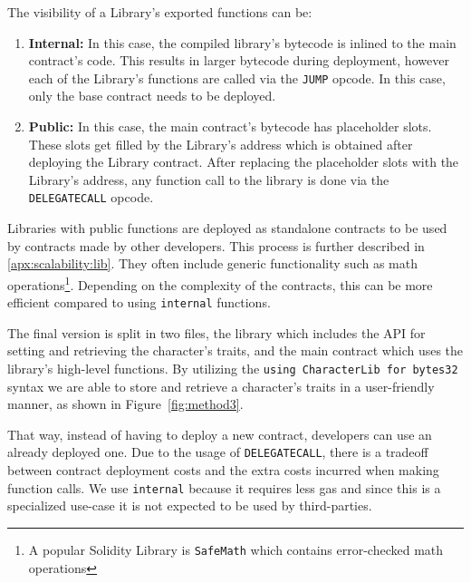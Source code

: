 The visibility of a Library's exported functions can be: 
\begin{enumerate}
    \item \textbf{Internal:}
        In this case, the compiled library's bytecode is inlined to the main contract's code. This results in larger bytecode during deployment, however each of the Library's functions are called via the \texttt{JUMP} opcode. In this case, only the base contract needs to be deployed.
    \item \textbf{Public:}
        In this case, the main contract's bytecode has placeholder slots. These slots get filled by the Library's address which is obtained after deploying the Library contract. After replacing the placeholder slots with the Library's address, any function call to the library is done via the \texttt{DELEGATECALL} opcode.
\end{enumerate}


Libraries with public functions are deployed as standalone contracts to be used by contracts made by other developers. This process is further described in \ref{apx:scalability:lib}. They often include generic functionality such as math operations\footnote{A popular Solidity Library is \texttt{SafeMath} which contains error-checked math operations}. Depending on the complexity of the contracts, this can be more efficient compared to using \texttt{internal} functions. %

The final version is split in two files, the library which includes the API for setting and retrieving the character's traits, and the main contract which uses the library's high-level functions. By utilizing the \texttt{using CharacterLib for bytes32} syntax we are able to store and retrieve a character's traits in a user-friendly manner, as shown in Figure~\ref{fig:method3}.


That way, instead of having to deploy a new contract, developers can use an already deployed one. Due to the usage of \texttt{DELEGATECALL}, there is a tradeoff between contract deployment costs and the extra costs incurred when making function calls. We use \texttt{internal} because it requires less gas and since this is a specialized use-case it is not expected to be used by third-parties.

